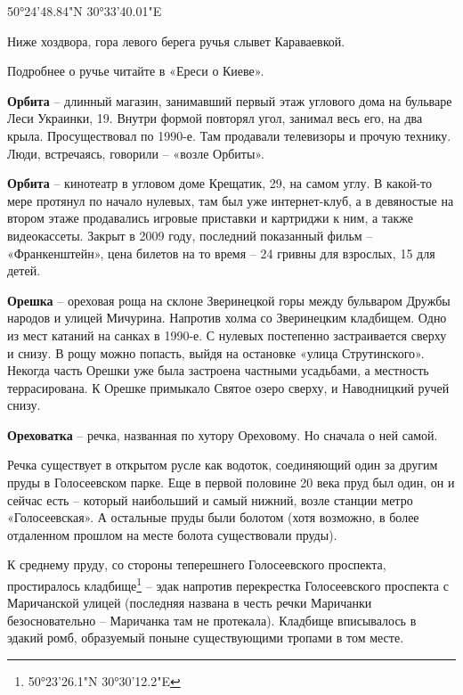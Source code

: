 50°24'48.84"N 30°33'40.01"E

Ниже хоздвора, гора левого берега ручья слывет Караваевкой.

Подробнее о ручье читайте в «Ереси о Киеве».\\

\medskip

\textbf{Орбита} – длинный магазин, занимавший первый этаж углового дома на бульваре Леси Украинки, 19. Внутри формой повторял угол, занимал весь его, на два крыла. Просуществовал по 1990-е. Там продавали телевизоры и прочую технику. Люди, встречаясь, говорили – «возле Орбиты».\\

\medskip

\textbf{Орбита} – кинотеатр в угловом доме Крещатик, 29, на самом углу. В какой-то мере протянул по начало нулевых, там был уже интернет-клуб, а в девяностые на втором этаже продавались игровые приставки и картриджи к ним, а также видеокассеты. Закрыт в 2009 году, последний показанный фильм – «Франкенштейн», цена билетов на то время – 24 гривны для взрослых, 15 для детей.\\

\medskip

\textbf{Орешка} – ореховая роща на склоне Зверинецкой горы между бульваром Дружбы народов и улицей Мичурина. Напротив холма со Зверинецким кладбищем. Одно из мест катаний на санках в 1990-е. С нулевых постепенно застраивается сверху и снизу. В рощу можно попасть, выйдя на остановке «улица Струтинского». Некогда часть Орешки уже была застроена частными усадьбами, а местность террасирована. К Орешке примыкало Святое озеро сверху, и Наводницкий ручей снизу.\\

\medskip

\textbf{Ореховатка} – речка, названная по хутору Ореховому. Но сначала о ней самой.

Речка существует в открытом русле как водоток, соединяющий один за другим пруды в Голосеевском парке. Еще в первой половине 20 века пруд был один, он и сейчас есть – который наибольший и самый нижний, возле станции метро «Голосеевская». А остальные пруды были болотом (хотя возможно, в более отдаленном прошлом на месте болота существовали пруды).

К среднему пруду, со стороны теперешнего Голосеевского проспекта, простиралось кладбище\footnote{50°23'26.1"N 30°30'12.2"E} – эдак напротив перекрестка Голосеевского проспекта с Маричанской улицей (последняя названа в честь речки Маричанки безосновательно – Маричанка там не протекала). Кладбище вписывалось в эдакий ромб, образуемый поныне существующими тропами в том месте.

